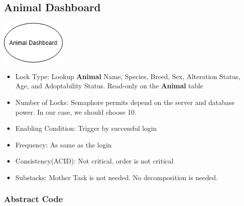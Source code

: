 \documentclass[a4paper]{article}
\begin{document}
\hypertarget{animal_dashboard}{\subsection{Animal Dashboard}}
\includegraphics[scale = 0.6]{animal_dashboard.png}

\begin{itemize}
        \item Lock Type: Lookup \textbf{Animal} Name, Species, Breed, Sex, Alteration Status, Age, and Adoptability Status. Read-only on the \textbf{Animal} table
        \item Number of Locks: Semaphore permits depend on the server and database power. In our case, we should choose 10.
	\item Enabling Condition: Trigger by successful login
        \item Frequency: As same as the login
        \item Consistency(ACID): Not critical, order is not critical
        \item Substacks: Mother Task is not needed. No decomposition is needed.
\end{itemize}

\subsubsection*{Abstract Code}
\end{document}
